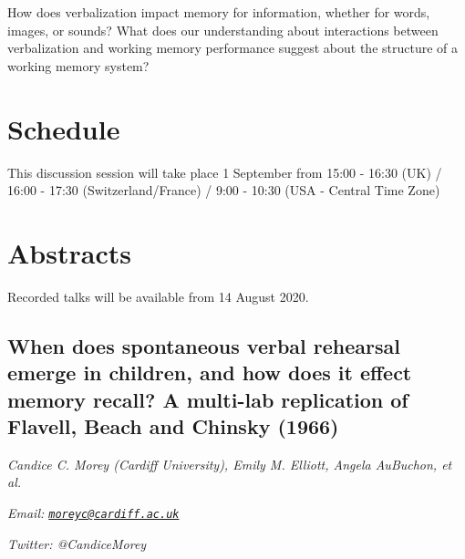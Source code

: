 \documentclass[12pt,]{book}
\begin{document}
How does verbalization impact memory for information, whether for words, images, or sounds? What does our understanding about interactions between verbalization and working memory performance suggest about the structure of a working memory system?

\hypertarget{schedule-1}{%
\section{Schedule}\label{schedule-1}}

This discussion session will take place 1 September from 15:00 - 16:30 (UK) / 16:00 - 17:30 (Switzerland/France) / 9:00 - 10:30 (USA - Central Time Zone)

\hypertarget{abstracts-1}{%
\section{Abstracts}\label{abstracts-1}}

Recorded talks will be available from 14 August 2020.

\hypertarget{when-does-spontaneous-verbal-rehearsal-emerge-in-children-and-how-does-it-effect-memory-recall-a-multi-lab-replication-of-flavell-beach-and-chinsky-1966}{%
\subsection{When does spontaneous verbal rehearsal emerge in children, and how does it effect memory recall? A multi-lab replication of Flavell, Beach and Chinsky (1966)}\label{when-does-spontaneous-verbal-rehearsal-emerge-in-children-and-how-does-it-effect-memory-recall-a-multi-lab-replication-of-flavell-beach-and-chinsky-1966}}

\emph{Candice C. Morey (Cardiff University), Emily M. Elliott, Angela AuBuchon, et al.}

\emph{Email: \href{mailto:moreyc@cardiff.ac.uk}{\nolinkurl{moreyc@cardiff.ac.uk}}}

\emph{Twitter: @CandiceMorey}
\end{document}
